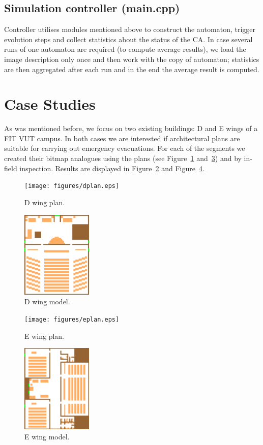 \subsection{Simulation controller (main.cpp)}
Controller utilises modules mentioned above to construct the automaton,
trigger evolution steps and collect statistics about the status of the CA.
In case several runs of one automaton are required (to compute average
results), we load the image description only once and then work with
the copy of automaton; statistics are then aggregated after each run and
in the end the average result is computed.

\section{Case Studies}
As was mentioned before, we focus on two existing buildings: D and E wings of a 
FIT VUT campus.
In both cases we are interested if architectural plans are suitable for carrying
out emergency evacuations.
For each of the segments we created their bitmap analogues using the plans
(see Figure~\ref{fig:dplan} and~\ref{fig:eplan}) and by in-field inspection.
Results are displayed in Figure~\ref{fig:dwing}
and Figure~\ref{fig:ewing}.

\begin{figure}
    \texttt{[image: figures/dplan.eps]}
    \caption{D wing plan.}
    \label{fig:dplan}
\end{figure}

\begin{figure}
    \includegraphics[width=0.3\textwidth]{figures/D.eps}
    \caption{D wing model.}
    \label{fig:dwing}
\end{figure}

\begin{figure}
    \texttt{[image: figures/eplan.eps]}
    \caption{E wing plan.}
    \label{fig:eplan}
\end{figure}

\begin{figure}
    \includegraphics[width=0.3\textwidth]{figures/E.eps}
    \caption{E wing model.}
    \label{fig:ewing}
\end{figure}

